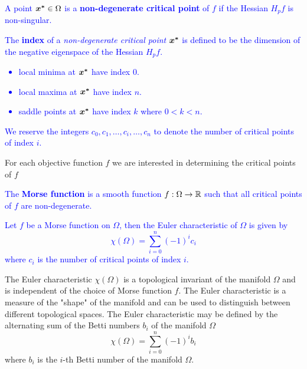 \documentclass[11pt]{article}
\begin{document}
    \begin{definition}
        \textcolor{blue}{
            A point $\bm{x^*} \in \Omega$ is a \textbf{non-degenerate critical point} of $f$ if
            the Hessian $H_p f$ is non-singular.
        }
    \end{definition}

    \begin{definition}
        \textcolor{blue}{
            The \textbf{index} of a \emph{non-degenerate critical point} $\bm{x^*}$ is defined to be
            the dimension of the negative eigenspace of the Hessian $H_p f$.
            \begin{itemize}
                \item local minima at $\bm{x^*}$ have index $0$.
                \item local maxima at $\bm{x^*}$ have index $n$.
                \item saddle points at $\bm{x^*}$ have index $k$ where $0 < k < n$.
            \end{itemize}
            We reserve the integers $c_0, c_1, \dots, c_i, \dots, c_n$ to denote the number of
            critical points of index $i$.
        }
    \end{definition}

    \begin{remark}
        For each objective function $f$ we are interested in determining the
        critical points of $f$ 
    \end{remark}

    \begin{remark}
        \textcolor{blue}{
            The \textbf{Morse function} is a smooth function $f : \Omega \rightarrow \mathbb{R}$ such that
            all critical points of $f$ are non-degenerate.
        }
    \end{remark}

    \begin{theorem}
        \textcolor{Blue}{
            Let $f$ be a Morse function on $\Omega$, then the Euler characteristic of $\Omega$ is
            given by
            $$
                \chi(\Omega) = \sum_{i=0}^n (-1)^i c_i
            $$
            where $c_i$ is the number of critical points of index $i$.
        }
    \end{theorem}

    \begin{remark}
        The Euler characteristic $\chi(\Omega)$ is a topological invariant of the manifold $\Omega$
        and is independent of the choice of Morse function $f$.
        The Euler characteristic is a measure of the "shape" of the manifold and can be used to
        distinguish between different topological spaces.
        The Euler characteristic may be defined by the alternating sum of the Betti numbers
        $b_i$ of the manifold $\Omega$
        $$
            \chi(\Omega) = \sum_{i=0}^n (-1)^i b_i
        $$
        where $b_i$ is the $i$-th Betti number of the manifold $\Omega$.
    \end{remark}
\end{document}
